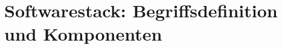\label{sec:softwarestack-begriffsdefinition}
\section{Softwarestack: Begriffsdefinition und Komponenten}